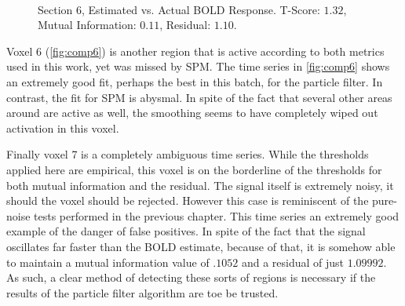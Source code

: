 \begin{figure}
\\
\caption{Section 6, Estimated vs. Actual BOLD Response. T-Score: $1.32$, Mutual Information: $0.11$, Residual: $1.10$.}
\label{fig:comp7}
\end{figure}

Voxel 6 (\autoref{fig:comp6}) is another region that is active according to both metrics used
in this work, yet was missed by SPM. The time series in \autoref{fig:comp6} shows an extremely
good fit, perhaps the best in this batch, for the particle filter. In contrast, the
fit for SPM is abysmal. In spite of the fact that several other areas around are active
as well, the smoothing seems to have completely wiped out activation in this voxel. 

Finally voxel 7 is a completely ambiguous time series. While the thresholds applied here
are empirical, this voxel is on the borderline of the thresholds for both mutual information
and the residual. The signal itself is extremely noisy, it should the voxel should be rejected.
However this case is reminiscent of the pure-noise tests performed in the previous chapter. 
This time series an extremely good example of the danger of false positives. In spite of the
fact that the signal oscillates far faster than the BOLD estimate, because of that, it is somehow
able to maintain a mutual information value of $.1052$ and a residual of just $1.09992$.
As such, a clear method of detecting these sorts of regions is necessary if the results
of the particle filter algorithm are toe be trusted. 

